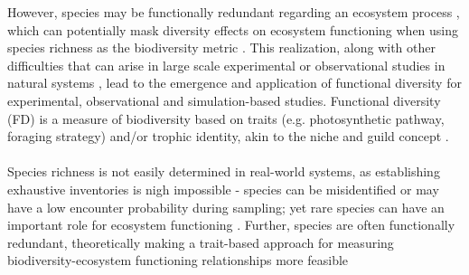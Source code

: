 %
However, species may be functionally redundant regarding an ecosystem process \citep{Hooper2002}, which can potentially mask diversity effects on ecosystem functioning when using species richness as the biodiversity metric \citep{Mora2014}. This realization, along with other difficulties that can arise in large scale experimental or observational studies in natural systems \citep[e.g. misidentification or low encounter probabilities during sampling;][]{Martinez1999}, lead to the emergence and application of functional diversity for experimental, observational and simulation-based studies. Functional diversity (FD) is a measure of biodiversity based on traits (e.g. photosynthetic pathway, foraging strategy) and/or trophic identity, akin to the niche and guild concept \citep{Hooper2002}. 
%
\\\\
%
Species richness is not easily determined in real-world systems, as establishing exhaustive inventories is nigh impossible - species can be misidentified or may have a low encounter probability during sampling; yet rare species can have an important role for ecosystem functioning \citep{Jain2013}. Further, species are often functionally redundant, theoretically making a trait-based approach for measuring biodiversity-ecosystem functioning relationships more feasible  \\\\


